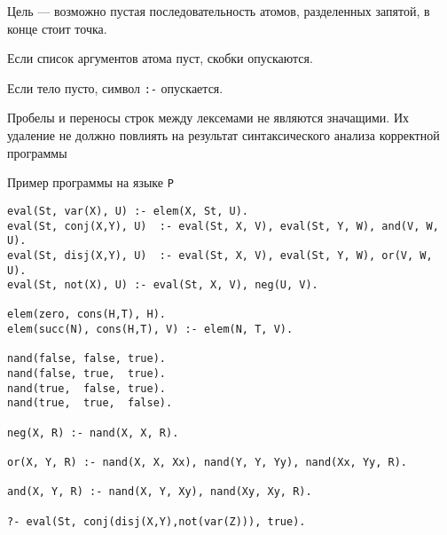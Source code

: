 \documentclass[12pt]{article}
\begin{document}
Цель --- возможно пустая последовательность атомов, разделенных запятой, в конце стоит точка. 

Если список аргументов атома пуст, скобки опускаются. 

Если тело пусто, символ \verb!:-! опускается. 

Пробелы и переносы строк между лексемами не являются значащими. Их удаление не должно повлиять на результат синтаксического анализа корректной программы

\begin{center}
    \Large{Пример программы на языке \verb!P!}
\end{center}

\begin{verbatim}
eval(St, var(X), U) :- elem(X, St, U).
eval(St, conj(X,Y), U)  :- eval(St, X, V), eval(St, Y, W), and(V, W, U).
eval(St, disj(X,Y), U)  :- eval(St, X, V), eval(St, Y, W), or(V, W, U).
eval(St, not(X), U) :- eval(St, X, V), neg(U, V).

elem(zero, cons(H,T), H).
elem(succ(N), cons(H,T), V) :- elem(N, T, V).

nand(false, false, true).
nand(false, true,  true).
nand(true,  false, true).
nand(true,  true,  false).

neg(X, R) :- nand(X, X, R).

or(X, Y, R) :- nand(X, X, Xx), nand(Y, Y, Yy), nand(Xx, Yy, R).

and(X, Y, R) :- nand(X, Y, Xy), nand(Xy, Xy, R).

?- eval(St, conj(disj(X,Y),not(var(Z))), true).
\end{verbatim}
\end{document}
